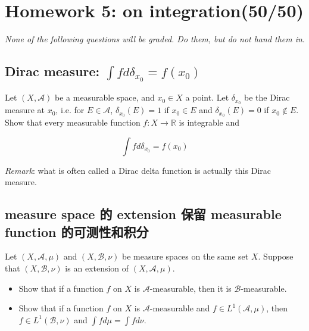 \chapter{Homework 5: on integration(50/50)}\label{homework-5-on-integration5050}

\emph{None of the following questions will be graded. Do them, but do not hand them in}.

\section{\texorpdfstring{Dirac measure: \(\int f d\delta_{x_{0}} = f(x_{0})\)}{Dirac measure: \textbackslash int f d\textbackslash delta\_\{x\_\{0\}\} = f(x\_\{0\})}}\label{dirac-measure-int-f-ddelta_x_0-fx_0}

Let \((X,\mathcal{A})\) be a measurable space, and \(x_{0} \in X\) a point. Let \(\delta_{x_{0}}\) be the Dirac measure at \(x_{0}\), i.e. for \(E \in \mathcal{A}\), \(\delta_{x_{0}}(E) = 1\) if \(x_{0} \in E\) and \(\delta_{x_{0}}(E) = 0\) if \(x_{0} \notin E\). Show that every measurable function \(f:X\rightarrow\mathbb{R}\) is integrable and

\[\int f d\delta_{x_{0}} = f(x_{0})\]

\emph{Remark}: what is often called a Dirac delta function is actually this Dirac measure.

\section{measure space 的 extension 保留 measurable function 的可测性和积分}\label{measure-space-ux7684-extension-ux4fddux7559-measurable-function-ux7684ux53efux6d4bux6027ux548cux79efux5206}

Let \((X,\mathcal{A},\mu)\) and \((X,\mathcal{B},\nu)\) be measure spaces on the same set \(X\). Suppose that \((X,\mathcal{B},\nu)\) is an extension of \((X,\mathcal{A},\mu)\).

\begin{itemize}
\item
  Show that if a function \(f\) on \(X\) is \(\mathcal{A}\)-measurable, then it is \(\mathcal{B}\)-measurable.
\item
  Show that if a function \(f\) on \(X\) is \(\mathcal{A}\)-measurable and \(f \in L^{1}(\mathcal{A},\mu)\), then \(f \in L^{1}(\mathcal{B},\nu)\) and \(\int f d\mu = \int f d\nu\).
\end{itemize}

